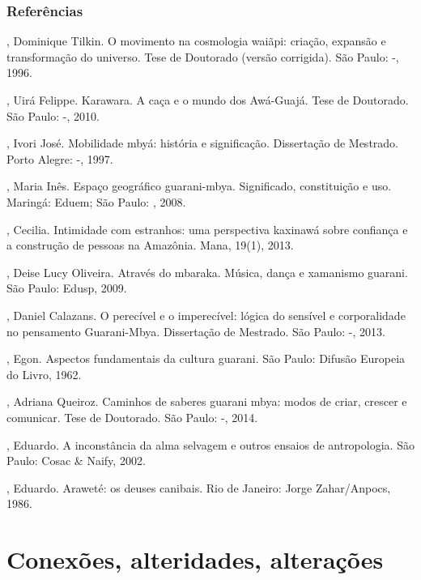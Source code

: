 \section{Referências}

\begin{Parskip}
, Dominique Tilkin. O movimento na cosmologia waiãpi:
criação, expansão e transformação do universo. Tese de Doutorado
(versão corrigida). São Paulo: -, 1996.

, Uirá Felippe. Karawara. A caça e o mundo dos Awá-Guajá.
Tese de Doutorado. São Paulo: -, 2010.

, Ivori José. Mobilidade mbyá: história e significação.
Dissertação de Mestrado. Porto Alegre: -, 1997.

, Maria Inês. Espaço geográfico guarani-mbya. Significado,
constituição e uso. Maringá: Eduem; São Paulo: , 2008.

, Cecilia. Intimidade com estranhos: uma perspectiva
kaxinawá sobre confiança e a construção de pessoas na Amazônia. Mana,
19(1), 2013.

, Deise Lucy Oliveira. Através do mbaraka. Música, dança e
xamanismo guarani. São Paulo: Edusp, 2009.

, Daniel Calazans. O perecível e o imperecível: lógica do
sensível e corporalidade no pensamento Guarani-Mbya. Dissertação de
Mestrado. São Paulo: -, 2013.

, Egon. Aspectos fundamentais da cultura guarani. São
Paulo: Difusão Europeia do Livro, 1962.

, Adriana Queiroz. Caminhos de saberes guarani mbya: modos de
criar, crescer e comunicar. Tese de Doutorado. São Paulo: -,
2014.

  , Eduardo. A inconstância da alma selvagem e
outros ensaios de antropologia. São Paulo: Cosac \& Naify, 2002.

  , Eduardo. Araweté: os deuses canibais. Rio de
Janeiro: Jorge Zahar/Anpocs, 1986.

\end{Parskip}

\part{Conexões, alteridades, alterações}
 
